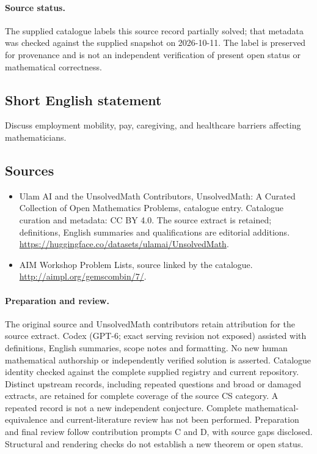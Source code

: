 \documentclass[11pt]{article}
\begin{document}
\paragraph{Source status.}
The supplied catalogue labels this source record partially solved; that metadata was checked against the supplied snapshot on 2026-10-11. The label is preserved for provenance and is not an independent verification of present open status or mathematical correctness.
\subsection{Short English statement}
Discuss employment mobility, pay, caregiving, and healthcare barriers affecting mathematicians.
\subsection{Sources}
\begin{itemize}
\item[\hypertarget{source:statement:1}{S1}] Ulam AI and the UnsolvedMath Contributors, UnsolvedMath: A Curated Collection of Open Mathematics Problems, catalogue entry. Catalogue curation and metadata: CC BY 4.0. The source extract is retained; definitions, English summaries and qualifications are editorial additions.
\url{https://huggingface.co/datasets/ulamai/UnsolvedMath}.
\item[\hypertarget{source:statement:2}{S2}] AIM Workshop Problem Lists, source linked by the catalogue.
\url{http://aimpl.org/gemscombin/7/}.
\end{itemize}
\paragraph{Preparation and review.}
The original source and UnsolvedMath contributors retain attribution for the source extract. Codex (GPT-6; exact serving revision not exposed) assisted with definitions, English summaries, scope notes and formatting. No new human mathematical authorship or independently verified solution is asserted. Catalogue identity checked against the complete supplied registry and current repository. Distinct upstream records, including repeated questions and broad or damaged extracts, are retained for complete coverage of the source CS category. A repeated record is not a new independent conjecture. Complete mathematical-equivalence and current-literature review has not been performed. Preparation and final review follow contribution prompts C and D, with source gaps disclosed. Structural and rendering checks do not establish a new theorem or open status.
\label{end:statement}
\end{document}
